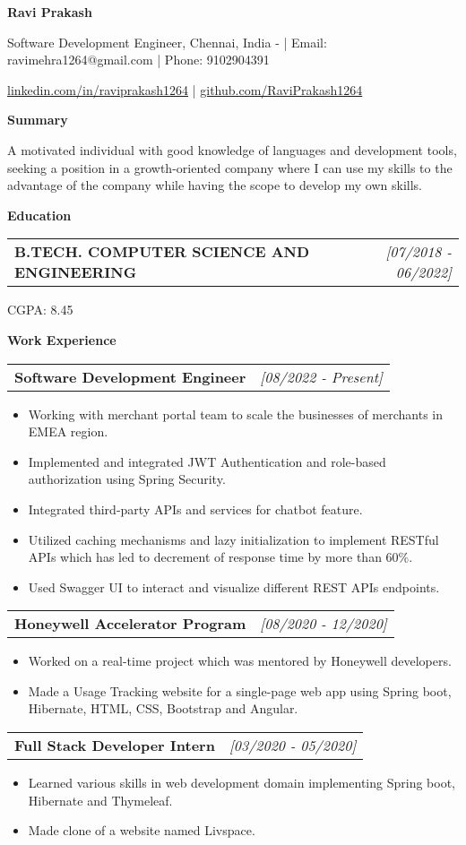 \documentclass[a4paper,10pt]{article}
\makeatletter
\newcommand{\resitem}[1]{\item #1}
\newcommand{\resheading}[1]{\vspace{0.5em} {\small \colorbox{mygrey}{{\begin{minipage}{0.975\textwidth}{{\textbf{#1}}}\end{minipage}}}} \vspace{0.5em}}
\newcommand{\ressubheading}[3]{\begin{tabular*}{6.62in}{l @{\extracolsep{\fill}} r} \textbf{#1} & \textit{[#2]} \\ \end{tabular*}\vspace{-8pt}}
\makeatother
\begin{document}
\begin{center} \Large{\textbf{Ravi Prakash}} \end{center}

\vspace{2pt}

\begin{center} Software Development Engineer, Chennai, India - | Email: ravimehra1264@gmail.com | Phone: 9102904391 \end{center}
\begin{center} \href{linkedin.com/in/raviprakash1264}{linkedin.com/in/raviprakash1264} | \href{github.com/RaviPrakash1264}{github.com/RaviPrakash1264} \end{center}

\resheading{Summary}
\resitem{A motivated individual with good knowledge of languages and development tools, seeking a position in a growth-oriented company where I can use my skills to the advantage of the company while having the scope to develop my own skills.}

\resheading{Education}
\ressubheading{B.TECH. COMPUTER SCIENCE AND ENGINEERING}{07/2018 - 06/2022}{VIT University, Vellore}
\resitem{CGPA: 8.45}

\resheading{Work Experience}
\ressubheading{Software Development Engineer}{08/2022 - Present}{Fiserv, Chennai}
\begin{itemize}
    \resitem{Working with merchant portal team to scale the businesses of merchants in EMEA region.}
    \resitem{Implemented and integrated JWT Authentication and role-based authorization using Spring Security.}
    \resitem{Integrated third-party APIs and services for chatbot feature.}
    \resitem{Utilized caching mechanisms and lazy initialization to implement RESTful APIs which has led to decrement of response time by more than 60\%.}
    \resitem{Used Swagger UI to interact and visualize different REST APIs endpoints.}
\end{itemize}
\ressubheading{Honeywell Accelerator Program}{08/2020 - 12/2020}{Honeywell, Remote}
\begin{itemize}
    \resitem{Worked on a real-time project which was mentored by Honeywell developers.}
    \resitem{Made a Usage Tracking website for a single-page web app using Spring boot, Hibernate, HTML, CSS, Bootstrap and Angular.}
\end{itemize}
\ressubheading{Full Stack Developer Intern}{03/2020 - 05/2020}{Foxmula, Remote}
\begin{itemize}
    \resitem{Learned various skills in web development domain implementing Spring boot, Hibernate and Thymeleaf.}
    \resitem{Made clone of a website named Livspace.}
\end{itemize}
\end{document}

